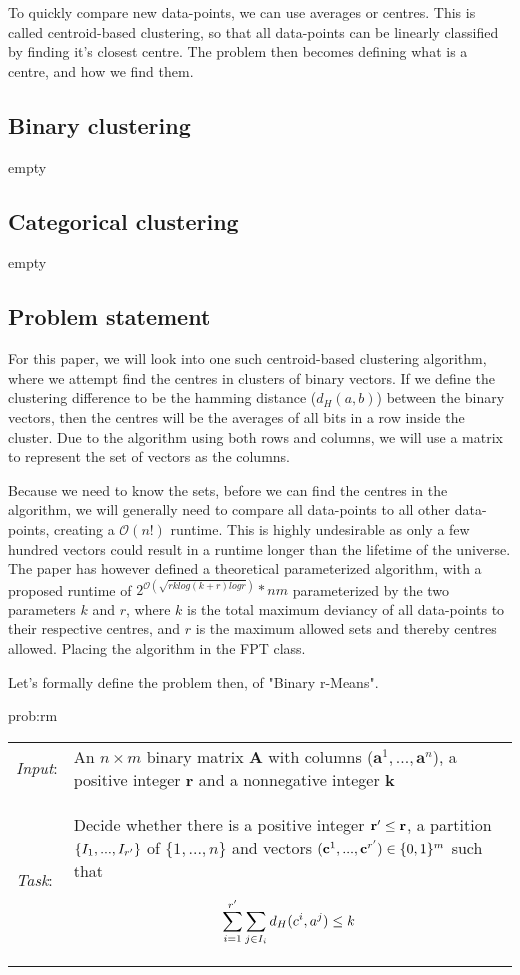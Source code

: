 \documentclass[a4paper]{article}
\begin{document}
To quickly compare new data-points, we can use averages or centres. This is called centroid-based
clustering, so that all data-points can be linearly classified by finding it's closest centre.
The problem then becomes defining what is a centre, and how we find them.

\subsection{Binary clustering} empty
\subsection{Categorical clustering} empty

\subsection{Problem statement}
For this paper, we will look into one such centroid-based clustering algorithm, where we attempt find
the centres in clusters of binary vectors. If we define the clustering difference to be the
hamming distance (\textit{$d_H(a, b)$}) between the binary vectors, then the centres will be the averages
of all bits in a row inside the cluster. Due to the algorithm using both rows and columns, we will
use a matrix to represent the set of vectors as the columns.

Because we need to know the sets, before we can find the centres in the algorithm, we will
generally need to compare all data-points to all other data-points, creating a $\mathcal{O}(n!)$ runtime. This
is highly undesirable as only a few hundred vectors could result in a runtime longer than the lifetime
of the universe. The paper \cite{fomin_golovach_panolan_2020} has however defined a
theoretical parameterized algorithm, with a proposed runtime of $2^{\mathcal{O} (\sqrt{rk log(k+r) logr})}*nm$
parameterized by the two parameters $k$ and $r$, where $k$ is the total maximum deviancy of all data-points
to their respective centres, and $r$ is the maximum allowed sets and thereby centres allowed. Placing
the algorithm in the FPT class.

Let's formally define the problem then, of "Binary r-Means".
\begin{problem}{prob:rm}
\begin{tabular}{p{}p{}}
    \textit{Input}: & An $n \times m$ binary matrix \textbf{A} with columns
    ($\textbf{a}^1,...,\textbf{a}^n$), a positive integer $\textbf{r}$ and a nonnegative
    integer $\textbf{k}$                                                                     \\

    \textit{Task}:  & Decide whether there is a positive integer $\textbf{r}\sp{\prime} \leq
        \textbf{r}$, a partition $\{I_1, ..., I_{r\sp{\prime}}\}$ of $\{1,...,n\}$ and vectors
    $(\textbf{c}^1,...,\textbf{c}^{r\sp{\prime}}) \in \{0,1\}^m$ such that

    \[
        \sum_{i = 1}^{r\sp{\prime}} \sum_{j \in I_i} d_H(c^i, a^j) \leq k
    \]
\end{tabular}
\end{problem}
\end{document}
